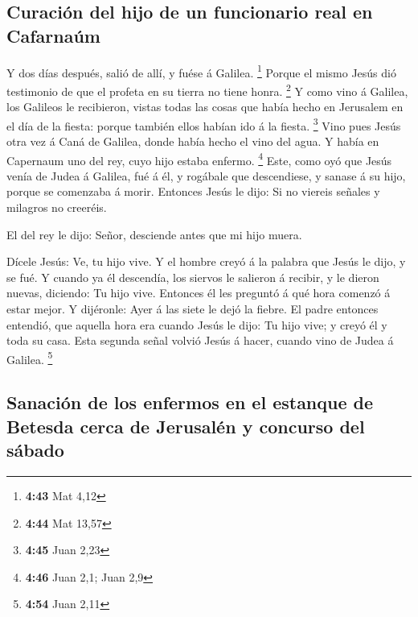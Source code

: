 \hypertarget{curaciuxf3n-del-hijo-de-un-funcionario-real-en-cafarnauxfam}{%
\subsection{Curación del hijo de un funcionario real en
Cafarnaúm}\label{curaciuxf3n-del-hijo-de-un-funcionario-real-en-cafarnauxfam}}

 Y dos días después, salió de allí, y fuése á Galilea.
\footnote{\textbf{4:43} Mat 4,12}  Porque el mismo Jesús
dió testimonio de que el profeta en su tierra no tiene honra.
\footnote{\textbf{4:44} Mat 13,57}  Y como vino á Galilea,
los Galileos le recibieron, vistas todas las cosas que había hecho en
Jerusalem en el día de la fiesta: porque también ellos habían ido á la
fiesta. \footnote{\textbf{4:45} Juan 2,23}  Vino pues Jesús
otra vez á Caná de Galilea, donde había hecho el vino del agua. Y había
en Capernaum uno del rey, cuyo hijo estaba enfermo. \footnote{\textbf{4:46}
  Juan 2,1; Juan 2,9}  Este, como oyó que Jesús venía de
Judea á Galilea, fué á él, y rogábale que descendiese, y sanase á su
hijo, porque se comenzaba á morir.  Entonces Jesús le dijo:
Si no viereis señales y milagros no creeréis.

 El del rey le dijo: Señor, desciende antes que mi hijo
muera.

 Dícele Jesús: Ve, tu hijo vive. Y el hombre creyó á la
palabra que Jesús le dijo, y se fué.  Y cuando ya él
descendía, los siervos le salieron á recibir, y le dieron nuevas,
diciendo: Tu hijo vive.  Entonces él les preguntó á qué
hora comenzó á estar mejor. Y dijéronle: Ayer á las siete le dejó la
fiebre.  El padre entonces entendió, que aquella hora era
cuando Jesús le dijo: Tu hijo vive; y creyó él y toda su casa.
 Esta segunda señal volvió Jesús á hacer, cuando vino de
Judea á Galilea. \footnote{\textbf{4:54} Juan 2,11}

\hypertarget{sanaciuxf3n-de-los-enfermos-en-el-estanque-de-betesda-cerca-de-jerusaluxe9n-y-concurso-del-suxe1bado}{%
\subsection{Sanación de los enfermos en el estanque de Betesda cerca de
Jerusalén y concurso del
sábado}\label{sanaciuxf3n-de-los-enfermos-en-el-estanque-de-betesda-cerca-de-jerusaluxe9n-y-concurso-del-suxe1bado}}

